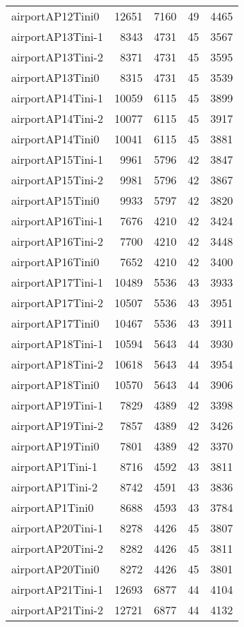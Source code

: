 \documentclass[../../../thesis.tex]{subfiles}
\begin{document}
\begin{longtable}{lrrrr}
airportAP12Tini0 & 12651 & 7160 & 49 & 4465 \\
airportAP13Tini-1 & 8343 & 4731 & 45 & 3567 \\
airportAP13Tini-2 & 8371 & 4731 & 45 & 3595 \\
airportAP13Tini0 & 8315 & 4731 & 45 & 3539 \\
airportAP14Tini-1 & 10059 & 6115 & 45 & 3899 \\
airportAP14Tini-2 & 10077 & 6115 & 45 & 3917 \\
airportAP14Tini0 & 10041 & 6115 & 45 & 3881 \\
airportAP15Tini-1 & 9961 & 5796 & 42 & 3847 \\
airportAP15Tini-2 & 9981 & 5796 & 42 & 3867 \\
airportAP15Tini0 & 9933 & 5797 & 42 & 3820 \\
airportAP16Tini-1 & 7676 & 4210 & 42 & 3424 \\
airportAP16Tini-2 & 7700 & 4210 & 42 & 3448 \\
airportAP16Tini0 & 7652 & 4210 & 42 & 3400 \\
airportAP17Tini-1 & 10489 & 5536 & 43 & 3933 \\
airportAP17Tini-2 & 10507 & 5536 & 43 & 3951 \\
airportAP17Tini0 & 10467 & 5536 & 43 & 3911 \\
airportAP18Tini-1 & 10594 & 5643 & 44 & 3930 \\
airportAP18Tini-2 & 10618 & 5643 & 44 & 3954 \\
airportAP18Tini0 & 10570 & 5643 & 44 & 3906 \\
airportAP19Tini-1 & 7829 & 4389 & 42 & 3398 \\
airportAP19Tini-2 & 7857 & 4389 & 42 & 3426 \\
airportAP19Tini0 & 7801 & 4389 & 42 & 3370 \\
airportAP1Tini-1 & 8716 & 4592 & 43 & 3811 \\
airportAP1Tini-2 & 8742 & 4591 & 43 & 3836 \\
airportAP1Tini0 & 8688 & 4593 & 43 & 3784 \\
airportAP20Tini-1 & 8278 & 4426 & 45 & 3807 \\
airportAP20Tini-2 & 8282 & 4426 & 45 & 3811 \\
airportAP20Tini0 & 8272 & 4426 & 45 & 3801 \\
airportAP21Tini-1 & 12693 & 6877 & 44 & 4104 \\
airportAP21Tini-2 & 12721 & 6877 & 44 & 4132 \\

\end{longtable}
\end{document}
